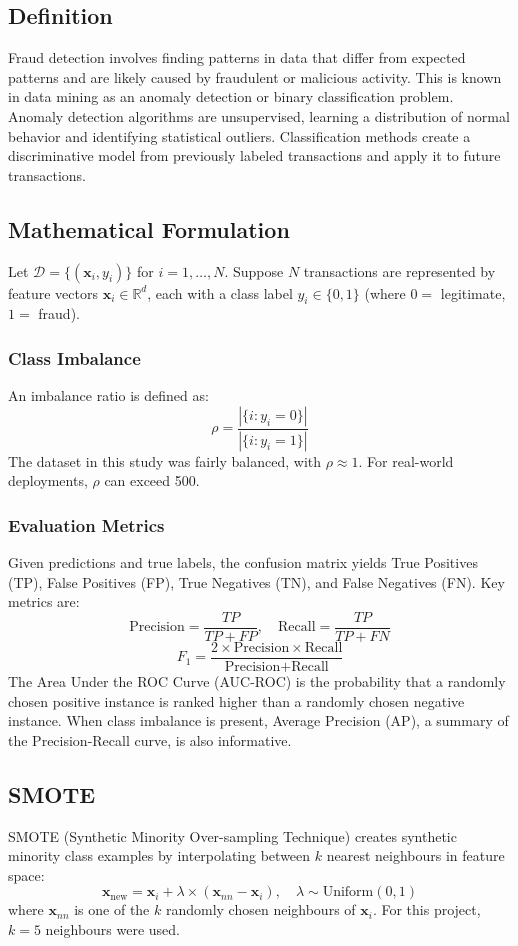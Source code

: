 \documentclass[conference]{IEEEtran}
\begin{document}
\subsection{Definition}
Fraud detection involves finding patterns in data that differ from expected patterns and are likely caused by fraudulent or malicious activity. This is known in data mining as an anomaly detection or binary classification problem. Anomaly detection algorithms are unsupervised, learning a distribution of normal behavior and identifying statistical outliers. Classification methods create a discriminative model from previously labeled transactions and apply it to future transactions.

\subsection{Mathematical Formulation}
Let $\mathcal{D} = \{(\mathbf{x}_i, y_i)\}$ for $i = 1, \ldots, N$. Suppose $N$ transactions are represented by feature vectors $\mathbf{x}_i \in \mathbb{R}^d$, each with a class label $y_i \in \{0, 1\}$ (where $0 =$ legitimate, $1 =$ fraud).

\subsubsection{Class Imbalance}
An imbalance ratio is defined as:
\[
\rho = \frac{|\{i : y_i = 0\}|}{|\{i : y_i = 1\}|}
\]
The dataset in this study was fairly balanced, with $\rho \approx 1$. For real-world deployments, $\rho$ can exceed 500.

\subsubsection{Evaluation Metrics}
Given predictions and true labels, the confusion matrix yields True Positives (TP), False Positives (FP), True Negatives (TN), and False Negatives (FN). Key metrics are:
\[
\text{Precision} = \frac{TP}{TP + FP}, \quad \text{Recall} = \frac{TP}{TP + FN}
\]
\[
F_1 = \frac{2 \times \text{Precision} \times \text{Recall}}{\text{Precision} + \text{Recall}}
\]
The Area Under the ROC Curve (AUC-ROC) is the probability that a randomly chosen positive instance is ranked higher than a randomly chosen negative instance. When class imbalance is present, Average Precision (AP), a summary of the Precision-Recall curve, is also informative.

\subsection{SMOTE}
SMOTE (Synthetic Minority Over-sampling Technique) creates synthetic minority class examples by interpolating between $k$ nearest neighbours in feature space:
\[
\mathbf{x}_{\text{new}} = \mathbf{x}_i + \lambda \times (\mathbf{x}_{nn} - \mathbf{x}_i), \quad \lambda \sim \text{Uniform}(0,1)
\]
where $\mathbf{x}_{nn}$ is one of the $k$ randomly chosen neighbours of $\mathbf{x}_i$. For this project, $k = 5$ neighbours were used.
\end{document}
